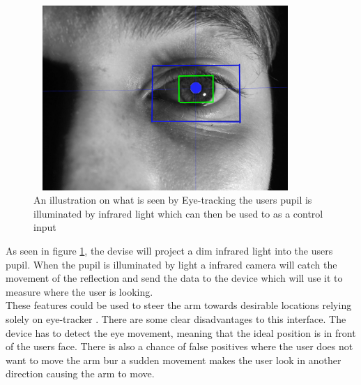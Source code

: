 \begin{figure}[H]
    \centering
    \includegraphics[width=10cm,height=7cm]{Figures/Contextual_figures/eye-tracking.png}
    \caption{An illustration on what is seen by Eye-tracking the users pupil is illuminated by infrared light which can then be used to as a control input}
    \label{fig:Eye}
\end{figure}

As seen in figure \ref{fig:Eye}, the devise will project  a dim infrared light into the users pupil. When the pupil is illuminated by light a infrared camera will catch the movement of the reflection and send the data to the device which will use it to measure where the user is looking.\\
These features could be used to steer the arm towards desirable locations relying solely on eye-tracker \cite{EyeTrack}. There are some clear disadvantages to this interface. The device has to detect the eye movement, meaning that the ideal position is in front of the users face. There is also a chance of false positives where the user does not want to move the arm bur a sudden movement makes the user look in another direction causing the arm to move. 

